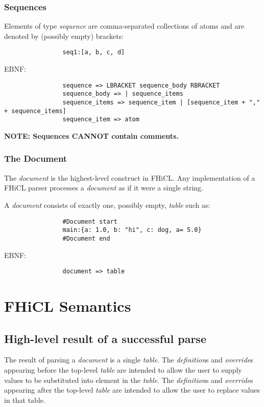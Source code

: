 \documentclass{memarticle}
\begin{document}
		\subsubsection{Sequences}
			Elements of type \emph{sequence} 
			are comma-separated collections of atoms 
			and are denoted by (possibly empty) brackets:
			\begin{verbatim}
				seq1:[a, b, c, d]
			\end{verbatim}
			\vspace{1mm}
			EBNF:
			\begin{verbatim}
				sequence => LBRACKET sequence_body RBRACKET
				sequence_body => | sequence_items
				sequence_items => sequence_item | [sequence_item + "," + sequence_items]
				sequence_item => atom
			\end{verbatim}
			\par
			\bf NOTE: \rm Sequences \bf CANNOT \rm contain comments.
		\subsubsection{The Document}
			The \emph{document} is the highest-level construct 
			in FHiCL.
			Any implementation of a FHiCL parser
			processes a \emph{document}
			as if it were a single string.

			A \emph{document} consists of exactly one,
			possibly empty,
			\emph{table} such as:
			\begin{verbatim}
				#Document start
				main:{a: 1.0, b: "hi", c: dog, a= 5.0}
				#Document end
			\end{verbatim}	
			\vspace{1mm}
			EBNF:
			\begin{verbatim}
				document => table
			\end{verbatim}

\section{FHiCL Semantics}
	\subsection{High-level result of a successful parse}

		The result of parsing a \emph{document}
		is a single \emph{table}.
		The \emph{definition}s and \emph{override}s
		appearing before the top-level \emph{table}
		are intended to allow the user
		to supply values to be substituted into element in the \emph{table}.
		The \emph{definition}s and \emph{override}s
		appearing after the top-level \emph{table}
		are intended to allow the user
		to replace values in that table.
\end{document}
